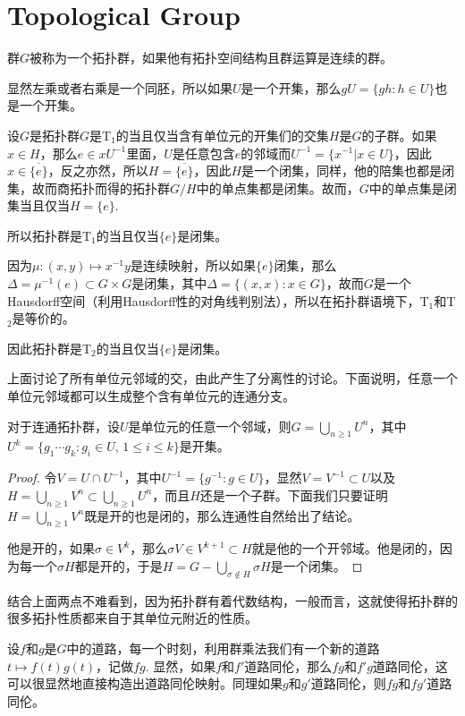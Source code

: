 \section*{Topological Group}

\para 群$G$被称为一个拓扑群，如果他有拓扑空间结构且群运算是连续的群。

\para 显然左乘或者右乘是一个同胚，所以如果$U$是一个开集，那么$gU=\{gh:h\in U\}$也是一个开集。

\para 设$G$是拓扑群$G$是T$_1$的当且仅当含有单位元的开集们的交集$H$是$G$的子群。如果$x\in H$，那么$e\in xU^{-1}$里面，$U$是任意包含$e$的邻域而$U^{-1}=\{x^{-1}|x\in U\}$，因此$x\in \overline{\{e\}}$，反之亦然，所以$H=\overline{\{e\}}$，因此$H$是一个闭集，同样，他的陪集也都是闭集，故而商拓扑而得的拓扑群$G/H$中的单点集都是闭集。故而，$G$中的单点集是闭集当且仅当$H=\{e\}$.

所以拓扑群是T$_1$的当且仅当$\{e\}$是闭集。

\para 因为$\mu:(x,y)\mapsto x^{-1}y$是连续映射，所以如果$\{e\}$闭集，那么$\Delta=\mu^{-1}(e)\subset G\times G$是闭集，其中$\Delta=\{(x,x):x\in G\}$，故而$G$是一个Hausdorff空间（利用Hausdorff性的对角线判别法），所以在拓扑群语境下，T$_1$和T$_2$是等价的。

因此拓扑群是T$_2$的当且仅当$\{e\}$是闭集。

上面讨论了所有单位元邻域的交，由此产生了分离性的讨论。下面说明，任意一个单位元邻域都可以生成整个含有单位元的连通分支。

\begin{pro}
对于连通拓扑群，设$U$是单位元的任意一个邻域，则$G=\bigcup_{n\geq 1}U^n$，其中$U^k=\{g_1\cdots g_k:g_i\in U,\, 1\leq i \leq k\}$是开集。
\end{pro}

\begin{proof}
令$V=U\cap U^{-1}$，其中$U^{-1}=\{g^{-1}:g\in U\}$，显然$V=V^{-1}\subset U$以及$H=\bigcup_{n\geq 1}V^n\subset \bigcup_{n\geq 1}U^n$，而且$H$还是一个子群。下面我们只要证明$H=\bigcup_{n\geq 1}V^n$既是开的也是闭的，那么连通性自然给出了结论。

他是开的，如果$\sigma\in V^k$，那么$\sigma V\in V^{k+1}\subset H$就是他的一个开邻域。他是闭的，因为每一个$\sigma H$都是开的，于是$H=G-\bigcup_{\sigma\notin H}\sigma H$是一个闭集。
\end{proof}

结合上面两点不难看到，因为拓扑群有着代数结构，一般而言，这就使得拓扑群的很多拓扑性质都来自于其单位元附近的性质。

\para 设$f$和$g$是$G$中的道路，每一个时刻，利用群乘法我们有一个新的道路$t\mapsto f(t)g(t)$，记做$fg$. 显然，如果$f$和$f'$道路同伦，那么$fg$和$f'g$道路同伦，这可以很显然地直接构造出道路同伦映射。同理如果$g$和$g'$道路同伦，则$fg$和$fg'$道路同伦。

